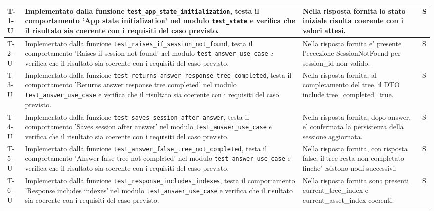 \documentclass[a4paper,12pt]{article}
\begin{document}
{{\begin{longtable}{|>{\RaggedRight\arraybackslash}p{1.55cm}|>{\RaggedRight\arraybackslash}p{8.0cm}|>{\RaggedRight\arraybackslash}p{4.6cm}|>{\RaggedRight\arraybackslash}p{1.2cm}|}
        \hline
        \endlastfoot
        T-1-U & Implementato dalla funzione \texttt{test\_\allowbreak app\_\allowbreak state\_\allowbreak initialization}, testa il comportamento 'App state initialization' nel modulo \texttt{test\_\allowbreak state} e verifica che il risultato sia coerente con i requisiti del caso previsto. & Nella risposta fornita lo stato iniziale risulta coerente con i valori attesi. & S \\
        \hline
        T-2-U & Implementato dalla funzione \texttt{test\_\allowbreak raises\_\allowbreak if\_\allowbreak session\_\allowbreak not\_\allowbreak found}, testa il comportamento 'Raises if session not found' nel modulo \texttt{test\_\allowbreak answer\_\allowbreak use\_\allowbreak case} e verifica che il risultato sia coerente con i requisiti del caso previsto. & Nella risposta fornita e' presente l'eccezione SessionNotFound per session\_id non valido. & S \\
        \hline
        T-3-U & Implementato dalla funzione \texttt{test\_\allowbreak returns\_\allowbreak answer\_\allowbreak response\_\allowbreak tree\_\allowbreak completed}, testa il comportamento 'Returns answer response tree completed' nel modulo \texttt{test\_\allowbreak answer\_\allowbreak use\_\allowbreak case} e verifica che il risultato sia coerente con i requisiti del caso previsto. & Nella risposta fornita, al completamento del tree, il DTO include tree\_completed=true. & S \\
        \hline
        T-4-U & Implementato dalla funzione \texttt{test\_\allowbreak saves\_\allowbreak session\_\allowbreak after\_\allowbreak answer}, testa il comportamento 'Saves session after answer' nel modulo \texttt{test\_\allowbreak answer\_\allowbreak use\_\allowbreak case} e verifica che il risultato sia coerente con i requisiti del caso previsto. & Nella risposta fornita, dopo answer, e' confermata la persistenza della sessione aggiornata. & S \\
        \hline
        T-5-U & Implementato dalla funzione \texttt{test\_\allowbreak answer\_\allowbreak false\_\allowbreak tree\_\allowbreak not\_\allowbreak completed}, testa il comportamento 'Answer false tree not completed' nel modulo \texttt{test\_\allowbreak answer\_\allowbreak use\_\allowbreak case} e verifica che il risultato sia coerente con i requisiti del caso previsto. & Nella risposta fornita, con risposta false, il tree resta non completato finche' esistono nodi successivi. & S \\
        \hline
        T-6-U & Implementato dalla funzione \texttt{test\_\allowbreak response\_\allowbreak includes\_\allowbreak indexes}, testa il comportamento 'Response includes indexes' nel modulo \texttt{test\_\allowbreak answer\_\allowbreak use\_\allowbreak case} e verifica che il risultato sia coerente con i requisiti del caso previsto. & Nella risposta fornita sono presenti current\_tree\_index e current\_asset\_index coerenti. & S \\

\end{longtable}}}
\end{document}
